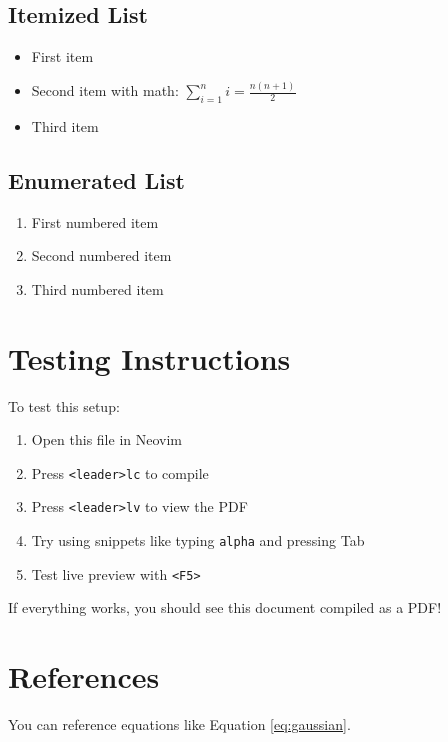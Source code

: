 \documentclass{article}
\begin{document}
\subsection{Itemized List}
\begin{itemize}
\item First item
\item Second item with math: $\sum_{i=1}^{n} i = \frac{n(n+1)}{2}$
\item Third item
\end{itemize}

\subsection{Enumerated List}
\begin{enumerate}
\item First numbered item
\item Second numbered item
\item Third numbered item
\end{enumerate}

\section{Testing Instructions}
To test this setup:
\begin{enumerate}
\item Open this file in Neovim
\item Press \texttt{<leader>lc} to compile
\item Press \texttt{<leader>lv} to view the PDF
\item Try using snippets like typing \texttt{alpha} and pressing Tab
\item Test live preview with \texttt{<F5>}
\end{enumerate}

If everything works, you should see this document compiled as a PDF!

\section{References}
You can reference equations like Equation \ref{eq:gaussian}.
\end{document}
